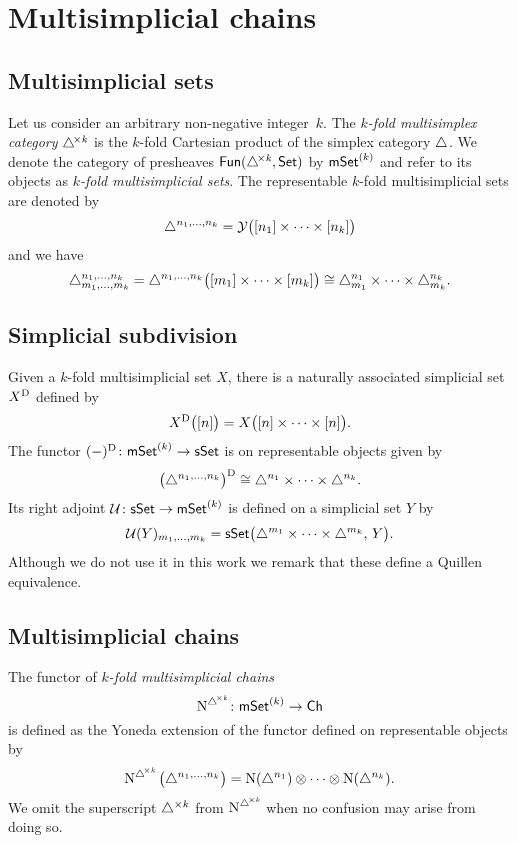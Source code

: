 
\section{Multisimplicial chains}

\subsection{Multisimplicial sets}

Let us consider an arbitrary non-negative integer~$k$.
The \textit{$k$-fold multisimplex category} $\triangle^{\!\times\mathit{k}}$ is the $k$-fold Cartesian product of the simplex category $\triangle$.
We denote the category of presheaves $\mathsf{Fun}(\triangle^{\!\times\mathit{k}}, \mathsf{Set})$ by $\mathsf{mSet}^{(k)}$ and refer to its objects as \textit{$k$-fold multisimplicial sets}.
The representable $k$-fold multisimplicial sets are denoted by
\[
\triangle^{n_1, \dots, n_k} = \mathcal{Y} \big( [n_1] \times \cdots \times [n_k] \big)
\]
and we have
\[
\triangle^{n_1, \dots, n_k}_{m_1, \dots, m_k} =
\triangle^{n_1, \dots, n_k} \big( [m_1] \times \cdots \times [m_k] \big) \cong
\triangle^{n_1}_{m_1} \times \dots \times \triangle^{n_k}_{m_k}.
\]

\subsection{Simplicial subdivision}

Given a $k$-fold multisimplicial set $X$, there is a naturally associated simplicial set $X^{\operatorname{D}}$ defined by
\[
X^{\operatorname{D}} \big( [n] \big) = X \big( [n] \times \dots \times [n] \big).
\]
The functor $(-)^{\operatorname{D}} \colon \mathsf{mSet}^{(k)} \to \mathsf{sSet}$ is on representable objects given by
\[
\big( \triangle^{n_1, \dots, n_k} \big)^{\operatorname{D}} \cong
\triangle^{n_1} \times \dots \times \triangle^{n_k}.
\]
Its right adjoint $\operatorname{\mathcal{U}} \colon \mathsf{sSet} \to \mathsf{mSet}^{(k)}$ is defined on a simplicial set $Y$ by
\[
\operatorname{\mathcal{U}}(Y)_{m_1, \dots, m_k} =
\mathsf{sSet}\big( \triangle^{m_1} \times \dots \times \triangle^{m_k}, \, Y \big).
\]
Although we do not use it in this work we remark that these define a Quillen equivalence.

\subsection{Multisimplicial chains}

The functor of \textit{$k$-fold multisimplicial chains}
\[
\operatorname{\operatorname{N}^{\triangle^{\!\times\mathit{k}}}} \colon \mathsf{mSet}^{(k)} \to \mathsf{Ch}
\]
is defined as the Yoneda extension of the functor defined on representable objects by
\[
\operatorname{\operatorname{N}^{\triangle^{\!\times\mathit{k}}}} \big( \triangle^{n_1, \dots, n_k} \big) =
\operatorname{N}(\triangle^{n_1}) \otimes \dotsb \otimes \operatorname{N}(\triangle^{n_k}).
\]
We omit the superscript $\triangle^{\times k}$ from $\operatorname{\operatorname{N}^{\triangle^{\!\times\mathit{k}}}}$ when no confusion may arise from doing so.

